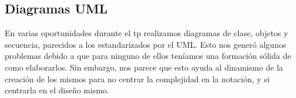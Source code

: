 \subsection{Diagramas UML}

En varias oportunidades durante el tp realizamos diagramas de clase, objetos y secuencia, parecidos a los estandarizados por el UML. Esto nos gener\'o algunos problemas debido a que para ninguno de ellos ten\'iamos una formaci\'on s\'olida de como elaborarlos. Sin embargo, nos parece que esto ayuda al dinamismo de la creaci\'on de los mismos para no centrar la complejidad en la notaci\'on, y si centrarla en el diseño mismo.

